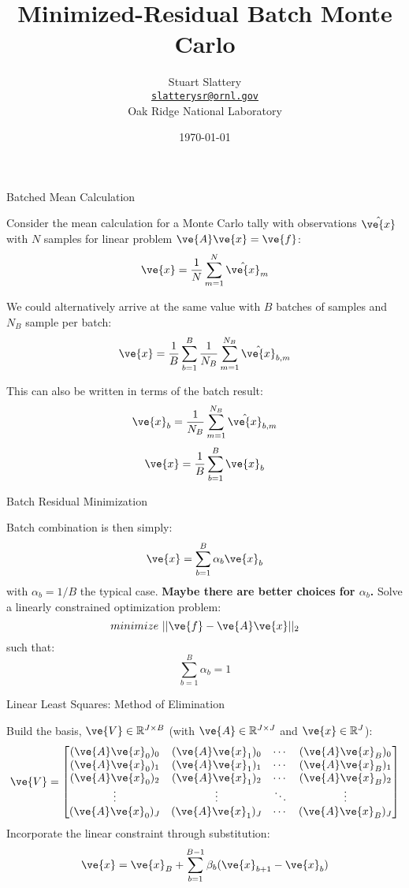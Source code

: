 \documentclass{beamer}
\author[Stuart Slattery]{Stuart Slattery\\
  \bigskip
  \href{mailto:slatterysr@ornl.gov}{\texttt{slatterysr@ornl.gov}} \\
  \bigskip
  Oak Ridge National Laboratory}
\date{\today}
\title[MRB Monte Carlo \hspace{1mm}
  \insertframenumber/\inserttotalframenumber]{Minimized-Residual Batch
Monte Carlo}
\begin{document}
\maketitle

\begin{frame}{Batched Mean Calculation}

  Consider the mean calculation for a Monte Carlo tally with
  observations $\hat{\ve{x}}$ with $N$ samples for linear problem
  $\ve{A}\ve{x}=\ve{f}$:
  \[
  \ve{x} = \frac{1}{N} \sum_{m=1}^N \hat{\ve{x}}_m
  \]

  We could alternatively arrive at the same value with $B$ batches of
  samples and $N_B$ sample per batch:
  \[
  \ve{x} = \frac{1}{B} \sum_{b=1}^B \frac{1}{N_B} \sum_{m=1}^{N_B}
  \hat{\ve{x}}_{b,m}
  \]

  This can also be written in terms of the batch result:
  \[
  \ve{x}_b=\frac{1}{N_B} \sum_{m=1}^{N_B} \hat{\ve{x}}_{b,m}
  \]
  \[
  \ve{x} = \frac{1}{B}\sum_{b=1}^B \ve{x}_b
  \]

\end{frame}

\begin{frame}{Batch Residual Minimization}

  Batch combination is then simply:
  \[
  \ve{x} = \sum_{b=1}^B \alpha_b \ve{x}_b
  \]
  with $\alpha_b = 1/B$ the typical case. \textbf{Maybe there are
    better choices for $\alpha_b$.} Solve a linearly constrained
  optimization problem:
  \[
  minimize\ ||\ve{f} - \ve{A}\ve{x}||_2
  \]
  such that:
  \[
  \sum_{b=1}^B \alpha_b = 1
  \]

\end{frame}

\begin{frame}{Linear Least Squares: Method of Elimination}

  Build the basis, $\ve{V} \in \mathbb{R}^{J \times B}$ (with $\ve{A}
  \in \mathbb{R}^{J \times J}$ and $\ve{x} \in \mathbb{R}^{J}$):
  \[
  \ve{V} = 
  \begin{bmatrix}
    (\ve{A}\ve{x}_0)_0 & (\ve{A}\ve{x}_1)_0 & \cdots & (\ve{A}\ve{x}_B)_0 \\
    (\ve{A}\ve{x}_0)_1 & (\ve{A}\ve{x}_1)_1 & \cdots & (\ve{A}\ve{x}_B)_1 \\
    (\ve{A}\ve{x}_0)_2 & (\ve{A}\ve{x}_1)_2 & \cdots & (\ve{A}\ve{x}_B)_2 \\
    \vdots             & \vdots            & \ddots & \vdots \\
    (\ve{A}\ve{x}_0)_J & (\ve{A}\ve{x}_1)_J & \cdots & (\ve{A}\ve{x}_B)_J \\
  \end{bmatrix}
  \]
  Incorporate the linear constraint through substitution:
  \[
  \ve{x} = \ve{x}_B + \sum_{b=1}^{B-1} \beta_b (\ve{x}_{b+1} - \ve{x}_b)
  \]
  
\end{frame}
\end{document}
